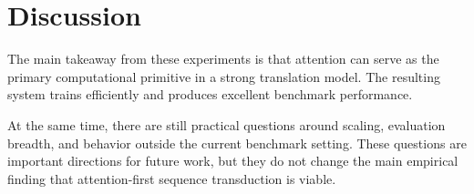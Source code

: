 \section{Discussion}

The main takeaway from these experiments is that attention can serve as the primary computational primitive in a strong translation model. The resulting system trains efficiently and produces excellent benchmark performance.

At the same time, there are still practical questions around scaling, evaluation breadth, and behavior outside the current benchmark setting. These questions are important directions for future work, but they do not change the main empirical finding that attention-first sequence transduction is viable.
